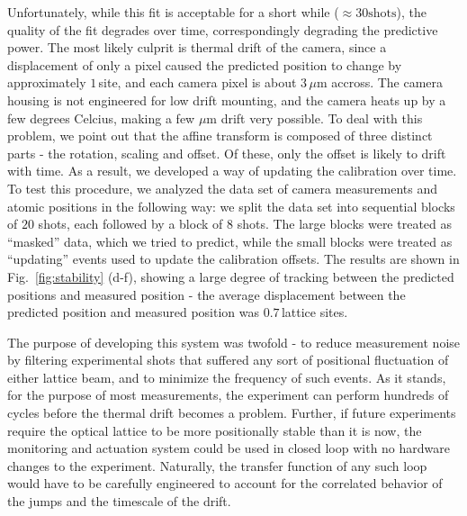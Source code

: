 \documentclass[twocolumn,aps,pra,showpacs,preprintnumbers,bibnotes]{revtex4-1}
\begin{document}
Unfortunately, while this fit is acceptable for a short while ($\approx30\mathrm{ shots}$), the quality of the fit degrades over time, correspondingly degrading the predictive power.
The most likely culprit is thermal drift of the camera, since a displacement of only a pixel caused the predicted position to change by approximately $1\,$site, and each camera pixel is about $3\,\mu$m accross.
The camera housing is not engineered for low drift mounting, and the camera heats up by a few degrees Celcius, making a few $\mu$m drift very possible.
To deal with this problem, we point out that the affine transform is composed of three distinct parts - the rotation, scaling and offset.
Of these, only the offset is likely to drift with time.
As a result, we developed a way of updating the calibration over time. To test this procedure, we analyzed the data set of camera measurements and atomic positions in the following way: we split the data set into sequential blocks of $20$ shots, each followed by a block of $8$ shots.
The large blocks were treated as ``masked'' data, which we tried to predict, while the small blocks were treated as ``updating'' events used to update the calibration offsets.
The results are shown in Fig.~\ref{fig:stability} (d-f), showing a large degree of tracking between the predicted positions and measured position - the average displacement between the predicted position and measured position was $0.7\,$lattice sites.

The purpose of developing this system was twofold - to reduce measurement noise by filtering experimental shots that suffered any sort of positional fluctuation of either lattice beam, and to minimize the frequency of such events. As it stands, for the purpose of most measurements, the experiment can perform hundreds of cycles before the thermal drift becomes a problem.
Further, if future experiments require the optical lattice to be more positionally stable than it is now, the monitoring and actuation system could be used in closed loop with no hardware changes to the experiment.
Naturally, the transfer function of any such loop would have to be carefully engineered to account for the correlated behavior of the jumps and the timescale of the drift.
\end{document}

